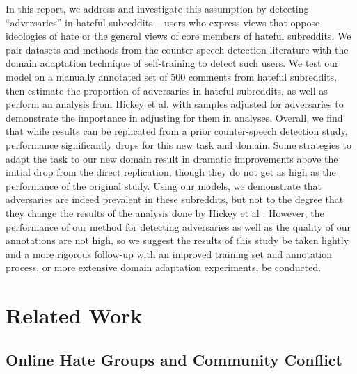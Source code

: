 \documentclass[10pt,twocolumn,letterpaper]{article}
\begin{document}
In this report, we address and investigate this assumption by detecting ``adversaries'' in hateful subreddits -- users who express views that oppose ideologies of hate or the general views of core members of hateful subreddits. We pair datasets and methods from the counter-speech detection literature with the domain adaptation technique of self-training \cite{ruder2018strong} to detect such users. We test our model on a manually annotated set of 500 comments from hateful subreddits, then estimate the proportion of adversaries in hateful subreddits, as well as perform an analysis from Hickey et al. \cite{hickey2023reddit} with samples adjusted for adversaries to demonstrate the importance in adjusting for them in analyses.
Overall, we find that while results can be replicated from a prior counter-speech detection study, performance significantly drops for this new task and domain. Some strategies to adapt the task to our new domain result in dramatic improvements above the initial drop from the direct replication, though they do not get as high as the performance of the original study. Using our models, we demonstrate that adversaries are indeed prevalent in these subreddits, but not to the degree that they change the results of the analysis done by Hickey et al \cite{hickey2023reddit}. However, the performance of our method for detecting adversaries as well as the quality of our annotations are not high, so we suggest the results of this study be taken lightly and a more rigorous follow-up with an improved training set and annotation process, or more extensive domain adaptation experiments, be conducted.

\section{Related Work}

\subsection{Online Hate Groups and Community Conflict}
\end{document}
